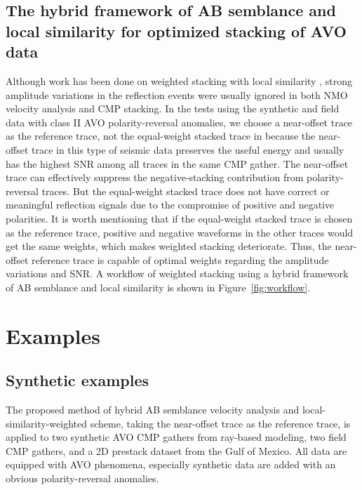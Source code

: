 \subsection{The hybrid framework of AB semblance and local similarity for optimized stacking of AVO data}
Although work has been done on weighted stacking with local similarity \cite[]{Sanchis11},
strong amplitude variations in the reflection events were
usually ignored in both NMO velocity analysis and CMP stacking. In the tests using the synthetic and field data
with class II AVO polarity-reversal anomalies, we choose
a near-offset trace as the reference trace, not the equal-weight 
stacked trace in \cite{Liu09} because the near-offset trace in this type of seismic data preserves the useful energy and usually has the highest SNR among all traces in the same CMP gather. The near-offset trace can effectively suppress the negative-stacking contribution from polarity-reversal traces. But the equal-weight stacked trace does not have correct or meaningful 
reflection signals due to the compromise of positive and negative polarities. It is worth mentioning that if the equal-weight stacked trace is chosen as the reference trace, positive and negative waveforms in the other traces would get the same weights, which makes weighted stacking deteriorate. Thus, the near-offset reference trace is capable of optimal weights regarding the amplitude variations and SNR. A workflow of weighted stacking using a hybrid framework of AB semblance and local similarity is shown in Figure~\ref{fig:workflow}. 


\section{Examples}
 \subsection{Synthetic examples}
The proposed method of hybrid AB semblance 
velocity analysis and local-similarity-weighted scheme,
taking the near-offset trace as the reference trace, is applied to 
two synthetic AVO CMP gathers from
ray-based modeling, two field CMP gathers, and a 2D prestack dataset from the Gulf of
Mexico. All data are equipped with AVO phenomena, especially synthetic data are added with an obvious polarity-reversal anomalies.

